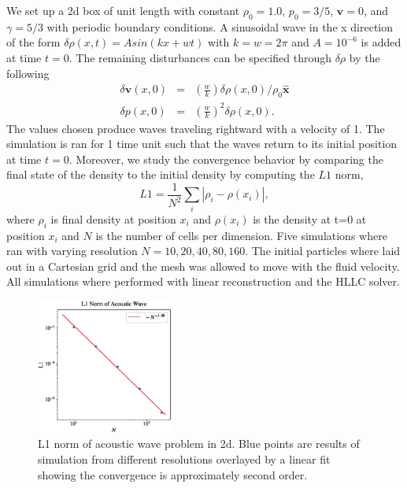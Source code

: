 We set up a 2d box of unit length with constant $\rho_0=1.0$, $p_0=3/5$, $\mathbf{v}=0$,
and $\gamma=5/3$ with periodic boundary conditions. A sinusoidal wave in the x direction of 
the form $\delta\rho(x,t) = Asin(kx + wt)$ with $k=w=2\pi$ and $A=10^{-6}$ is added at time 
$t=0$. The remaining disturbances can be specified through $\delta\rho$ by the following
\begin{equation}
	\begin{array}{rcl}
        \delta \mathbf{v}(x,0) & = & \left(\frac{w}{k}\right)\delta
        	\rho(x,0)/\rho_0\mathbf{\hat{x}}\\
        \delta p(x,0) & = & \left(\frac{w}{k}\right)^2\delta\rho(x,0).
    \end{array}
\end{equation}
The values chosen produce waves traveling rightward with a velocity of 1. The simulation is
ran for 1 time unit such that the waves return to its initial position at time $t=0$. 
Moreover, we study the convergence behavior by comparing the final state of the density to 
the initial density by computing the $L1$ norm,
\begin{equation}
	L1 = \frac{1}{N^2}\sum_i \left| \rho_i - \rho(x_i) \right|,
\end{equation}
where $\rho_i$ is final density at position $x_i$ and $\rho(x_i)$ is the density at t=0
at position $x_i$ and $N$ is the number of cells per dimension. Five simulations where ran
with varying resolution $N=10, 20, 40, 80, 160$. The initial particles where laid out in a
Cartesian grid and the mesh was allowed to move with the fluid velocity. All simulations
where performed with linear reconstruction and the HLLC solver.
\begin{figure}
    \begin{center}
        \includegraphics[width=0.4\textwidth]{figures/acoustic-wave-l1.eps}
        \caption{L1 norm of acoustic wave problem in 2d. Blue points are results
        of simulation from different resolutions overlayed by a linear fit showing
        the convergence is approximately second order.}
        \label{fig.acoustic}
    \end{center}
\end{figure}


